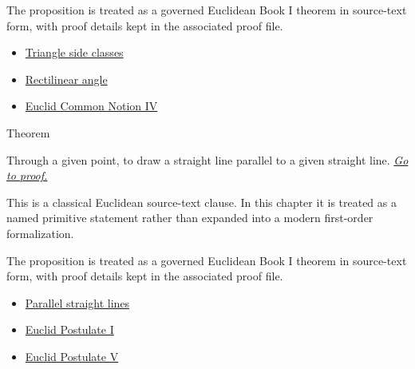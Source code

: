 \begin{remark*}[Interpretation]
The proposition is treated as a governed Euclidean Book I theorem in source-text
form, with proof details kept in the associated proof file.
\end{remark*}
\begin{lra-not-visible}
\begin{dependencies}
\begin{itemize}
  \item \hyperref[def:euclid-triangle-side-classes]{Triangle side classes}
  \item \hyperref[def:euclid-rectilinear-angle]{Rectilinear angle}
  \item \hyperref[ax:euclid-common-notion-coinciding-things-equal]{Euclid Common Notion IV}
\end{itemize}
\end{dependencies}
\end{lra-not-visible}

\begin{theorembox}{Theorem}
\begin{theorem}
\label{thm:euclid-i-31}
Through a given point, to draw a straight line parallel to a given straight
line.
\hyperref[prf:euclid-i-31]{\textit{Go to proof.}}
\end{theorem}
\end{theorembox}

\begin{remark*}
This is a classical Euclidean source-text clause. In this chapter it is treated
as a named primitive statement rather than expanded into a modern first-order
formalization.
\end{remark*}

\begin{remark*}[Interpretation]
The proposition is treated as a governed Euclidean Book I theorem in source-text
form, with proof details kept in the associated proof file.
\end{remark*}
\begin{lra-not-visible}
\begin{dependencies}
\begin{itemize}
  \item \hyperref[def:euclid-parallel-straight-lines]{Parallel straight lines}
  \item \hyperref[ax:euclid-postulate-draw-straight-line]{Euclid Postulate I}
  \item \hyperref[ax:euclid-postulate-parallel]{Euclid Postulate V}
\end{itemize}
\end{dependencies}
\end{lra-not-visible}

